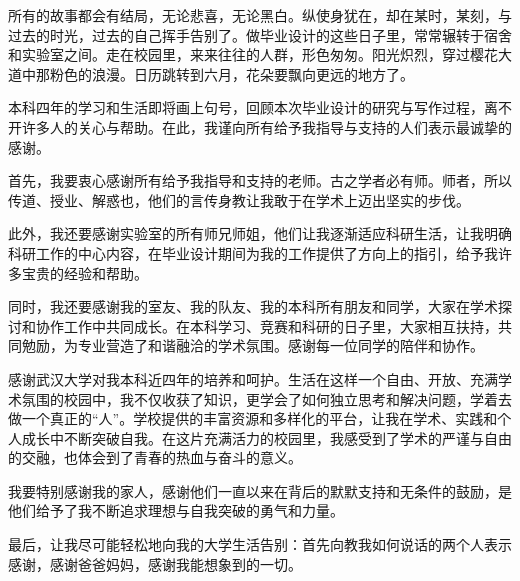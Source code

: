 \begin{acknowledgements}

所有的故事都会有结局，无论悲喜，无论黑白。纵使身犹在，却在某时，某刻，与过去的时光，过去的自己挥手告别了。做毕业设计的这些日子里，常常辗转于宿舍和实验室之间。走在校园里，来来往往的人群，形色匆匆。阳光炽烈，穿过樱花大道中那粉色的浪漫。日历跳转到六月，花朵要飘向更远的地方了。

本科四年的学习和生活即将画上句号，回顾本次毕业设计的研究与写作过程，离不开许多人的关心与帮助。在此，我谨向所有给予我指导与支持的人们表示最诚挚的感谢。

首先，我要衷心感谢所有给予我指导和支持的老师。古之学者必有师。师者，所以传道、授业、解惑也，他们的言传身教让我敢于在学术上迈出坚实的步伐。

此外，我还要感谢实验室的所有师兄师姐，他们让我逐渐适应科研生活，让我明确科研工作的中心内容，在毕业设计期间为我的工作提供了方向上的指引，给予我许多宝贵的经验和帮助。

同时，我还要感谢我的室友、我的队友、我的本科所有朋友和同学，大家在学术探讨和协作工作中共同成长。在本科学习、竞赛和科研的日子里，大家相互扶持，共同勉励，为专业营造了和谐融洽的学术氛围。感谢每一位同学的陪伴和协作。

感谢武汉大学对我本科近四年的培养和呵护。生活在这样一个自由、开放、充满学术氛围的校园中，我不仅收获了知识，更学会了如何独立思考和解决问题，学着去做一个真正的“人”。学校提供的丰富资源和多样化的平台，让我在学术、实践和个人成长中不断突破自我。在这片充满活力的校园里，我感受到了学术的严谨与自由的交融，也体会到了青春的热血与奋斗的意义。

我要特别感谢我的家人，感谢他们一直以来在背后的默默支持和无条件的鼓励，是他们给予了我不断追求理想与自我突破的勇气和力量。

最后，让我尽可能轻松地向我的大学生活告别：首先向教我如何说话的两个人表示感谢，感谢爸爸妈妈，感谢我能想象到的一切。

\end{acknowledgements}
